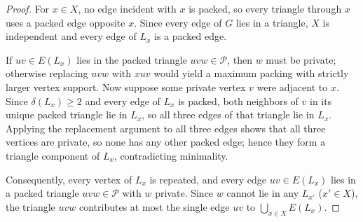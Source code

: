 \documentclass[11pt]{article}
\begin{document}
\begin{proof}
For $x\in X$, no edge incident with $x$ is packed, so every triangle through $x$ uses a packed edge opposite $x$. Since every edge of $G$ lies in a triangle, $X$ is independent and every edge of $L_x$ is a packed edge.

If $uv\in E(L_x)$ lies in the packed triangle $uvw\in\mathcal{P}$, then $w$ must be private; otherwise replacing $uvw$ with $xuv$ would yield a maximum packing with strictly larger vertex support. Now suppose some private vertex $v$ were adjacent to $x$. Since $\delta(L_x)\geq 2$ and every edge of $L_x$ is packed, both neighbors of $v$ in its unique packed triangle lie in $L_x$, so all three edges of that triangle lie in $L_x$. Applying the replacement argument to all three edges shows that all three vertices are private, so none has any other packed edge; hence they form a triangle component of $L_x$, contradicting minimality.

Consequently, every vertex of $L_x$ is repeated, and every edge $uv\in E(L_x)$ lies in a packed triangle $uvw\in\mathcal{P}$ with $w$ private. Since $w$ cannot lie in any $L_{x'}$ ($x'\in X$), the triangle $uvw$ contributes at most the single edge $uv$ to $\bigcup_{x\in X}E(L_x)$.
\end{proof}
\end{document}
